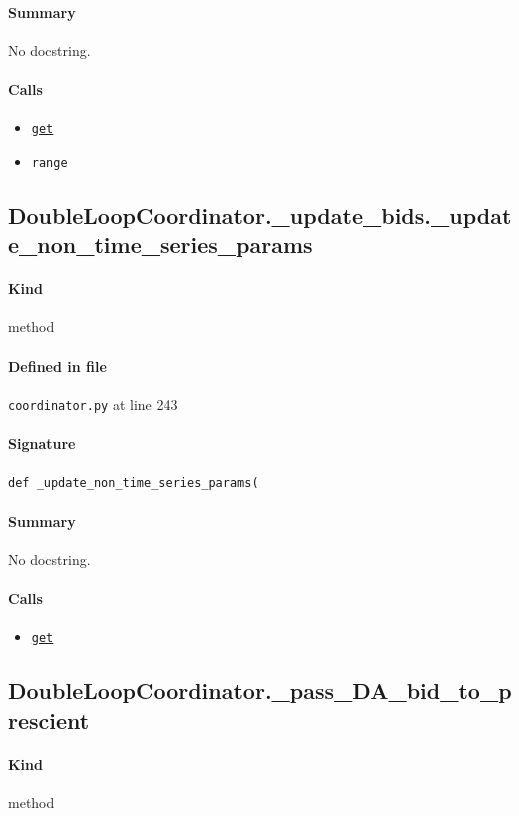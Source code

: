 \documentclass[11pt]{report}
\begin{document}
\paragraph{Summary} No docstring.
\paragraph{Calls}
\begin{itemize}[leftmargin=*]
  \item \hyperref[def:tests-test_backcaster.py:DAPrices.get:L294]{\texttt{get}}
  \item \texttt{range}
\end{itemize}
\subsection{DoubleLoopCoordinator.\_update\_bids.\_update\_non\_time\_series\_params}
\label{def:coordinator.py:DoubleLoopCoordinator._update_bids._update_non_time_series_params:L243}
\paragraph{Kind} method
\paragraph{Defined in file} \texttt{coordinator.py} at line 243
\paragraph{Signature} \texttt{def \_update\_non\_time\_series\_params(}
\paragraph{Summary} No docstring.
\paragraph{Calls}
\begin{itemize}[leftmargin=*]
  \item \hyperref[def:tests-test_backcaster.py:DAPrices.get:L294]{\texttt{get}}
\end{itemize}
\subsection{DoubleLoopCoordinator.\_pass\_DA\_bid\_to\_prescient}
\label{def:coordinator.py:DoubleLoopCoordinator._pass_DA_bid_to_prescient:L272}
\paragraph{Kind} method
\end{document}
